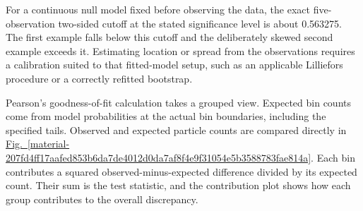 \documentclass[11pt,a4paper]{article}
\begin{document}
For a continuous null model fixed before observing the data, the exact five-observation two-sided cutoff at the stated significance level is about 0.563275. The first example falls below this cutoff and the deliberately skewed second example exceeds it. Estimating location or spread from the observations requires a calibration suited to that fitted-model setup, such as an applicable Lilliefors procedure or a correctly refitted bootstrap.


Pearson's goodness-of-fit calculation takes a grouped view. Expected bin counts come from model probabilities at the actual bin boundaries, including the specified tails. Observed and expected particle counts are compared directly in \hyperref[material-207fd4ff17aafed853b6da7de4012d0da7af8f4e9f31054e5b3588783fae814a]{Fig.~\ref*{material-207fd4ff17aafed853b6da7de4012d0da7af8f4e9f31054e5b3588783fae814a}}. Each bin contributes a squared observed-minus-expected difference divided by its expected count. Their sum is the test statistic, and the contribution plot shows how each group contributes to the overall discrepancy.
\end{document}

